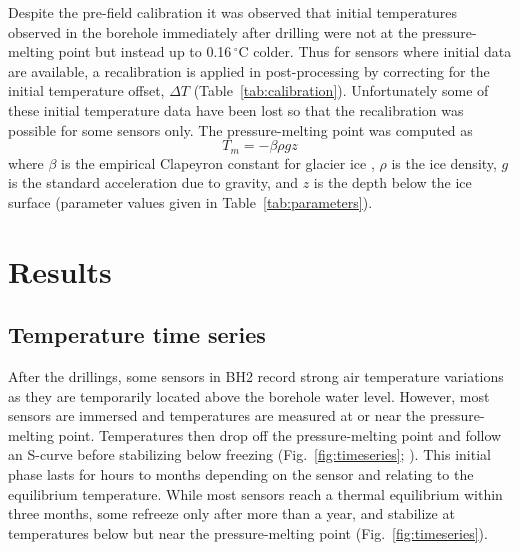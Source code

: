 \documentclass[utf8]{article}
\begin{document}
    Despite the pre-field calibration it was observed that initial temperatures
    observed in the borehole immediately after drilling were not at the
    pressure-melting point but instead up to 0.16\,$^\circ$C colder.  Thus for
    sensors where initial data are available, a recalibration is applied in
    post-processing by correcting for the initial temperature offset, $\Delta
    T$ (Table~\ref{tab:calibration}). Unfortunately some of these initial
    temperature data have been lost so that the recalibration was possible for
    some sensors only. The pressure-melting point was computed as
    \begin{equation}
      T_m = -\beta \rho g z
    \end{equation}
    where $\beta$ is the empirical Clapeyron constant for glacier ice
    \citep{Luthi.etal.2002}, $\rho$ is the ice density, $g$ is the standard
    acceleration due to gravity, and $z$ is the depth below the ice surface
    (parameter values given in Table~\ref{tab:parameters}).


\section{Results}

\subsection{Temperature time series}

    After the drillings, some sensors in BH2 record strong air temperature
    variations as they are temporarily located above the borehole water level.
    However, most sensors are immersed and temperatures are measured at or near
    the pressure-melting point. Temperatures then drop off the pressure-melting
    point and follow an S-curve before stabilizing below freezing
    (Fig.~\ref{fig:timeseries}; \citealp[cf.][Fig.~3.6]{Ryser.2014}). This
    initial phase lasts for hours to months
    depending on the sensor and relating to the equilibrium temperature. While
    most sensors reach a thermal equilibrium within three months, some refreeze
    only after more than a year, and stabilize at temperatures below but near
    the pressure-melting point (Fig.~\ref{fig:timeseries}).
\end{document}

